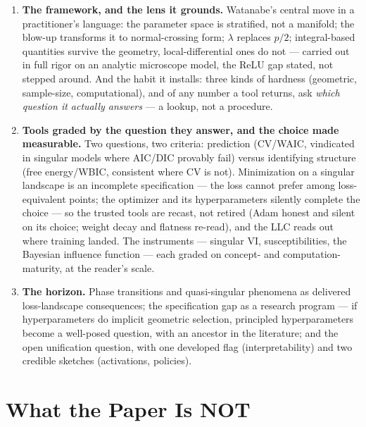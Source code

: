 \documentclass[11pt]{article}
\begin{document}
\begin{enumerate}[label=\textbf{\arabic*.}, leftmargin=*, itemsep=6pt]
\item \textbf{The framework, and the lens it grounds.}
Watanabe's central move in a practitioner's language: the parameter
space is stratified, not a manifold; the blow-up transforms it to
normal-crossing form; $\lambda$ replaces $p/2$; integral-based
quantities survive the geometry, local-differential ones do not ---
carried out in full rigor on an analytic microscope model, the ReLU gap
stated, not stepped around. And the habit it installs: three kinds of
hardness (geometric, sample-size, computational), and of any number a
tool returns, ask \emph{which question it actually answers} --- a
lookup, not a procedure.

\item \textbf{Tools graded by the question they answer, and the choice
made measurable.}
Two questions, two criteria: prediction (CV/WAIC, vindicated in
singular models where AIC/DIC provably fail) versus identifying
structure (free energy/WBIC, consistent where CV is not). Minimization
on a singular landscape is an incomplete specification --- the loss
cannot prefer among loss-equivalent points; the optimizer and its
hyperparameters silently complete the choice --- so the trusted tools
are recast, not retired (Adam honest and silent on its choice; weight
decay and flatness re-read), and the LLC reads out where training
landed. The instruments --- singular VI, susceptibilities, the Bayesian
influence function --- each graded on concept- and
computation-maturity, at the reader's scale.

\item \textbf{The horizon.}
Phase transitions and quasi-singular phenomena as delivered
loss-landscape consequences; the specification gap as a research
program --- if hyperparameters do implicit geometric selection,
principled hyperparameters become a well-posed question, with an
ancestor in the literature; and the open unification question, with
one developed flag (interpretability) and two credible sketches
(activations, policies).

\end{enumerate}

\section{What the Paper Is NOT}
\end{document}
